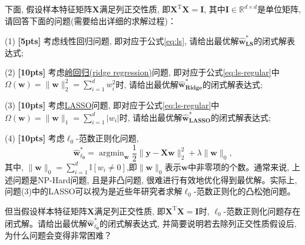 \documentclass[a4paper,UTF8]{article}
\numberwithin{equation}{section}
\theoremstyle{definition}
\begin{document}
下面, 假设样本特征矩阵$\mathbf{X}$满足列正交性质, 即$\mathbf{X}^\mathrm{T}\mathbf{X} = \mathbf{I}$, 其中$\mathbf{I}\in \mathbb{R}^{d\times d}$是单位矩阵, 请回答下面的问题(需要给出详细的求解过程)：

(1) \textbf{[5pts]} 考虑线性回归问题, 即对应于公式\eqref{eq:ls}, 请给出最优解$\hat{\mathbf{w}}_{\textbf{LS}}^*$的闭式解表达式;

(2) \textbf{[10pts]} 考虑\href{https://en.wikipedia.org/wiki/Tikhonov_regularization}{岭回归(ridge regression)}问题, 即对应于公式\eqref{eq:ls-regular}中$\Omega(\mathbf{w}) = \lVert \mathbf{w}\rVert_2^2=\sum_{i=1}^d w_i^2$时, 请给出最优解$\hat{\mathbf{w}}_{\textbf{Ridge}}^*$的闭式解表达式;

(3) \textbf{[10pts]} 考虑\href{https://en.wikipedia.org/wiki/LASSO}{LASSO}问题, 即对应于公式\eqref{eq:ls-regular}中$\Omega(\mathbf{w}) = \lVert \mathbf{w}\rVert_1=\sum_{i=1}^d \vert w_i\vert$时, 请给出最优解$\hat{\mathbf{w}}_{\textbf{LASSO}}^*$的闭式解表达式;

(4) \textbf{[10pts]} 考虑$\ell_0$-范数正则化问题, 
\begin{equation}
\label{eq:ls-l0}
\hat{\mathbf{w}}_{\mathbf{\ell_0}}^* = \mathop{\arg\min}_{\mathbf{w}} \frac{1}{2}\lVert \mathbf{y} - \mathbf X \mathbf{w} \rVert_2^2 +\lambda \lVert \mathbf{w}\rVert_0,
\end{equation}
其中, $\lVert \mathbf{w}\rVert_0=\sum_{i=1}^d \mathbb{I}[w_i \neq 0]$,即$\lVert \mathbf{w}\rVert_0$表示$\mathbf{w}$中非零项的个数。通常来说, 上述问题是NP-Hard问题, 且是非凸问题, 很难进行有效地优化得到最优解。实际上, 问题(3)中的LASSO可以视为是近些年研究者求解$\ell_0$-范数正则化的凸松弛问题。

但当假设样本特征矩阵$\mathbf{X}$满足列正交性质, 即$\mathbf{X}^\mathrm{T}\mathbf{X} = \mathbf{I}$时, $\ell_0$-范数正则化问题存在闭式解。请给出最优解$\hat{\mathbf{w}}_{\mathbf{\ell_0}}^*$的闭式解表达式, 并简要说明若去除列正交性质假设后, 为什么问题会变得非常困难？
\end{document}
